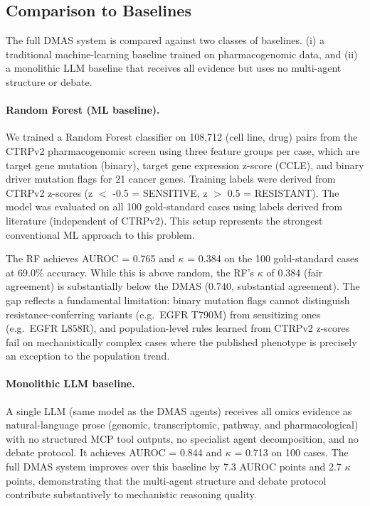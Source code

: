 \documentclass{article}
\begin{document}
\subsection{Comparison to Baselines}
\label{sec:baselines}

The full DMAS system is compared against two classes of baselines. (i) a traditional machine-learning baseline trained on pharmacogenomic data, and (ii) a monolithic LLM baseline that receives all evidence but uses no multi-agent structure or debate.

\paragraph{Random Forest (ML baseline).}
We trained a Random Forest classifier on 108,712 (cell line, drug) pairs from the CTRPv2 pharmacogenomic screen using three feature groups per case, which are target gene mutation (binary), target gene expression z-score (CCLE), and binary driver mutation flags for 21 cancer genes. Training labels were derived from CTRPv2 z-scores (z $<$ -0.5 = SENSITIVE, z $>$ 0.5 = RESISTANT). The model was evaluated on all 100 gold-standard cases using labels derived from literature (independent of CTRPv2). This setup represents the strongest conventional ML approach to this problem.

The RF achieves AUROC = 0.765 and $\kappa$ = 0.384 on the 100 gold-standard cases at 69.0\% accuracy. While this is above random, the RF's $\kappa$ of 0.384 (fair agreement) is substantially below the DMAS (0.740, substantial agreement). The gap reflects a fundamental limitation: binary mutation flags cannot distinguish resistance-conferring variants (e.g.\ EGFR T790M) from sensitizing ones (e.g.\ EGFR L858R), and population-level rules learned from CTRPv2 z-scores fail on mechanistically complex cases where the published phenotype is precisely an exception to the population trend.

\paragraph{Monolithic LLM baseline.}
A single LLM (same model as the DMAS agents) receives all omics evidence as natural-language prose (genomic, transcriptomic, pathway, and pharmacological) with no structured MCP tool outputs, no specialist agent decomposition, and no debate protocol. It achieves AUROC = 0.844 and $\kappa$ = 0.713 on 100 cases. The full DMAS system improves over this baseline by 7.3 AUROC points and 2.7 $\kappa$ points, demonstrating that the multi-agent structure and debate protocol contribute substantively to mechanistic reasoning quality.
\end{document}
